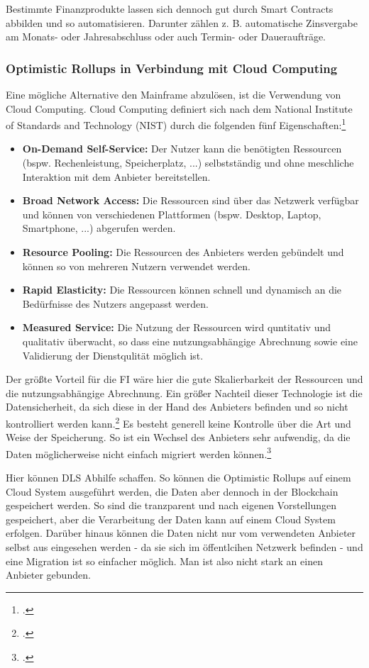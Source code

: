 \noindent
Bestimmte Finanzprodukte lassen sich dennoch gut durch Smart Contracts abbilden und so automatisieren.
Darunter zählen z. B. automatische Zinsvergabe am Monats- oder Jahresabschluss oder auch Termin- oder Daueraufträge.

\subsubsection{Optimistic Rollups in Verbindung mit Cloud Computing}
Eine mögliche Alternative den Mainframe abzulösen, ist die Verwendung von Cloud Computing.
Cloud Computing definiert sich nach dem National Institute of Standards and Technology (NIST) durch die folgenden fünf Eigenschaften:\footcite[Vgl. hierzu und zum Folgenden][5]{q11}
\begin{itemize}
    \item \textbf{On-Demand Self-Service:} 
    Der Nutzer kann die benötigten Ressourcen (bspw. Rechenleistung, Speicherplatz, ...) selbstständig und ohne meschliche Interaktion mit dem Anbieter bereitstellen.
    \item \textbf{Broad Network Access:}
    Die Ressourcen sind über das Netzwerk verfügbar und können von verschiedenen Plattformen (bspw. Desktop, Laptop, Smartphone, ...) abgerufen werden.
    \item \textbf{Resource Pooling:}
    Die Ressourcen des Anbieters werden gebündelt und können so von mehreren Nutzern verwendet werden.
    \item \textbf{Rapid Elasticity:}
    Die Ressourcen können schnell und dynamisch an die Bedürfnisse des Nutzers angepasst werden.
    \item \textbf{Measured Service:}
    Die Nutzung der Ressourcen wird quntitativ und qualitativ überwacht, so dass eine nutzungsabhängige Abrechnung sowie eine Validierung der Dienstqulität möglich ist.
\end{itemize}

\noindent
Der größte Vorteil für die FI wäre hier die gute Skalierbarkeit der Ressourcen und die nutzungsabhängige Abrechnung.
\bigbreak
\noindent
Ein größer Nachteil dieser Technologie ist die Datensicherheit, da sich diese in der Hand des Anbieters befinden und so nicht kontrolliert werden kann.\footcite[Vgl. hierzu und zum Folgenden][99]{q10}
Es besteht generell keine Kontrolle über die Art und Weise der Speicherung.
So ist ein Wechsel des Anbieters sehr aufwendig, da die Daten möglicherweise nicht einfach migriert werden können.\footcite[Vgl.][]{w28}

\noindent
Hier können DLS Abhilfe schaffen.
So können die Optimistic Rollups auf einem Cloud System ausgeführt werden, die Daten aber dennoch in der Blockchain gespeichert werden.
So sind die tranzparent und nach eigenen Vorstellungen gespeichert, aber die Verarbeitung der Daten kann auf einem Cloud System erfolgen.
Darüber hinaus können die Daten nicht nur vom verwendeten Anbieter selbst aus eingesehen werden - da sie sich im öffentlcihen Netzwerk befinden - und eine Migration ist so einfacher möglich.
Man ist also nicht stark an einen Anbieter gebunden.